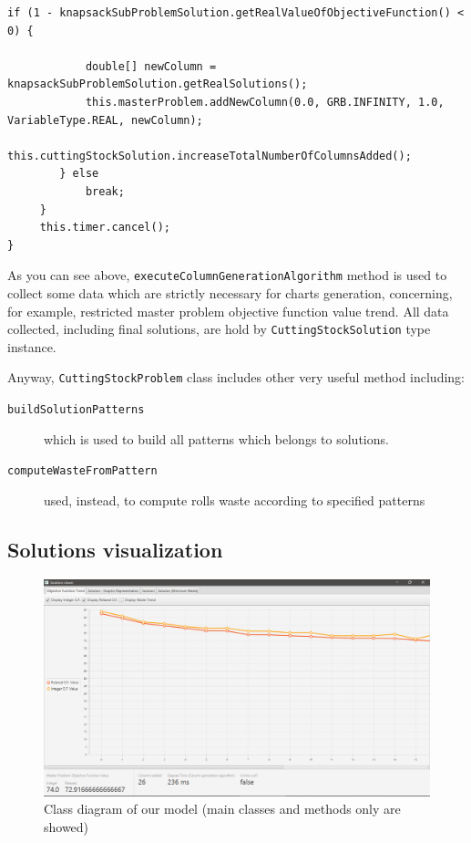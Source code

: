 \documentclass[10pt,a4paper]{article}
\begin{document}
\begin{itemize}
\begin{adjustwidth}{-2cm}{-2cm}
\begin{lstlisting}[frame=lines, caption={\texttt{executeColumnGenerationAlgorithm()} method implementation.}, label={code:cga}]
        if (1 - knapsackSubProblemSolution.getRealValueOfObjectiveFunction() < 0) {

            double[] newColumn = knapsackSubProblemSolution.getRealSolutions();
            this.masterProblem.addNewColumn(0.0, GRB.INFINITY, 1.0, VariableType.REAL, newColumn);
            this.cuttingStockSolution.increaseTotalNumberOfColumnsAdded();
        } else
            break;
     }
     this.timer.cancel();
}
\end{lstlisting}
\end{adjustwidth} 

\end{itemize}

As you can see above, \texttt{executeColumnGenerationAlgorithm} method is used to collect some data which are strictly necessary for charts generation, concerning, for example, restricted master problem objective function value trend. All data collected, including final solutions, are hold by \texttt{CuttingStockSolution} type instance.

Anyway, \texttt{CuttingStockProblem} class includes other very useful method including:

\begin{description}
\item[\texttt{buildSolutionPatterns}] which is used to build all patterns which belongs to solutions.

\item[\texttt{computeWasteFromPattern}] used, instead, to compute rolls waste according to specified patterns
\end{description}

\newpage
\subsection{Solutions visualization}

\begin{figure}[H]
\includegraphics[width=\textwidth]{./images/main.png}
\centering
\caption{Class diagram of our model (main classes and methods only are showed)}

\end{figure}
\end{document}
